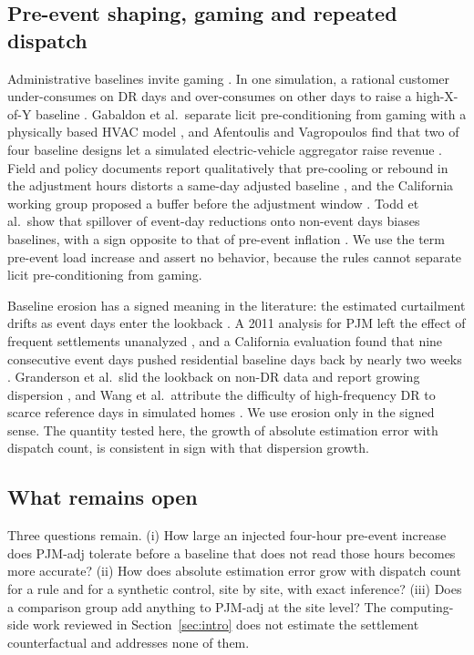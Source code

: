 \subsection{Pre-event shaping, gaming and repeated dispatch}\label{sec:background:shaping}

Administrative baselines invite gaming \citep{chao2011}. In one simulation, a rational customer under-consumes on DR days and over-consumes on other days to raise a high-X-of-Y baseline \citep{wang2022manipulation}. Gabaldon et al.\ separate licit pre-conditioning from gaming with a physically based HVAC model \citep{gabaldon2021}, and Afentoulis and Vagropoulos find that two of four baseline designs let a simulated electric-vehicle aggregator raise revenue \citep{afentoulis2025}. Field and policy documents report qualitatively that pre-cooling or rebound in the adjustment hours distorts a same-day adjusted baseline \citep{coughlin2009,braithwait2010,recurve2022caiso}, and the California working group proposed a buffer before the adjustment window \citep{caiso_bawg2017}. Todd et al.\ show that spillover of event-day reductions onto non-event days biases baselines, with a sign opposite to that of pre-event inflation \citep{todd2019}. We use the term pre-event load increase and assert no behavior, because the rules cannot separate licit pre-conditioning from gaming.

Baseline erosion has a signed meaning in the literature: the estimated curtailment drifts as event days enter the lookback \citep{enernoc2009naesb,caiso_bawg2017}. A 2011 analysis for PJM left the effect of frequent settlements unanalyzed \citep{kema2011pjm}, and a California evaluation found that nine consecutive event days pushed residential baseline days back by nearly two weeks \citep{dsa2023elrp}. Granderson et al.\ slid the lookback on non-DR data and report growing dispersion \citep{granderson2023}, and Wang et al.\ attribute the difficulty of high-frequency DR to scarce reference days in simulated homes \citep{wang2026physics}. We use erosion only in the signed sense. The quantity tested here, the growth of absolute estimation error with dispatch count, is consistent in sign with that dispersion growth.

\subsection{What remains open}\label{sec:background:open}

Three questions remain. (i) How large an injected four-hour pre-event increase does PJM-adj tolerate before a baseline that does not read those hours becomes more accurate? (ii) How does absolute estimation error grow with dispatch count for a rule and for a synthetic control, site by site, with exact inference? (iii) Does a comparison group add anything to PJM-adj at the site level? The computing-side work reviewed in Section~\ref{sec:intro} does not estimate the settlement counterfactual and addresses none of them.
